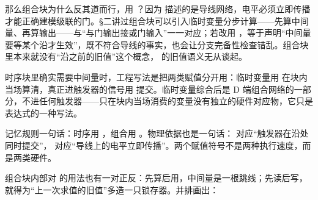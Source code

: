 那么组合块为什么反其道而行，用 \code{=}？因为  描述的是导线网络，电平必须立即传播才能正确建模级联的门。§二讲过组合块可以引入临时变量分步计算——先算中间量、再算输出——与“与门输出接或门输入”一一对应；若改用 \code{<=}，等于声明“中间量要等某个沿才生效”，既不符合导线的事实，也会让分支完备性检查错乱。组合块里本来就没有“沿之前的旧值”这个概念，\code{<=} 的旧值语义无从谈起。

时序块里确实需要中间量时，工程写法是把两类赋值分开用：临时变量用 \code{=} 在块内当场算清，真正进触发器的信号用 \code{<=} 提交。临时变量综合后是 D 端组合网络的一部分，不进任何触发器——只在块内当场消费的变量没有独立的硬件对应物，它只是表达式的一种写法。

记忆规则一句话：时序用 \code{<=}，组合用 \code{=}。物理依据也是一句话：\code{<=} 对应“触发器在沿处同时提交”，\code{=} 对应“导线上的电平立即传播”。两个赋值符号不是两种执行速度，而是两类硬件。

组合块内部对 \code{=} 的用法也有一对正反：先算后用，中间量是一根跳线；先读后写，就得为“上一次求值的旧值”多造一只锁存器。并排画出：

